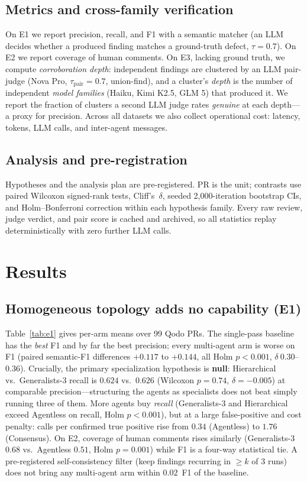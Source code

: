 \documentclass[conference]{IEEEtran}
\begin{document}
\subsection{Metrics and cross-family verification}
On E1 we report precision, recall, and F1 with a semantic matcher (an LLM decides
whether a produced finding matches a ground-truth defect, $\tau{=}0.7$). On E2 we
report coverage of human comments. On E3, lacking ground truth, we compute
\emph{corroboration depth}: independent findings are clustered by an LLM
pair-judge (Nova Pro, $\tau_{\text{pair}}{=}0.7$, union-find), and a cluster's
\emph{depth} is the number of independent \emph{model families} (Haiku, Kimi
K2.5, GLM 5) that produced it. We report the fraction of clusters a second LLM
judge rates \emph{genuine} at each depth---a proxy for precision. Across all
datasets we also collect operational cost: latency, tokens, LLM calls, and
inter-agent messages.

\subsection{Analysis and pre-registration}
Hypotheses and the analysis plan are pre-registered. PR is the unit; contrasts
use paired Wilcoxon signed-rank tests, Cliff's~$\delta$, seeded 2{,}000-iteration
bootstrap CIs, and Holm--Bonferroni correction within each hypothesis family.
Every raw review, judge verdict, and pair score is cached and archived, so all
statistics replay deterministically with zero further LLM calls.

\section{Results}
\subsection{Homogeneous topology adds no capability (E1)}
Table~\ref{tab:e1} gives per-arm means over 99 Qodo PRs. The single-pass baseline
has the \emph{best} F1 and by far the best precision; every multi-agent arm is
worse on F1 (paired semantic-F1 differences $+0.117$ to $+0.144$, all Holm
$p<0.001$, $\delta\ 0.30$--$0.36$). Crucially, the primary specialization
hypothesis is \textbf{null}: Hierarchical vs.\ Generalists-3 recall is
$0.624$ vs.\ $0.626$ (Wilcoxon $p{=}0.74$, $\delta{=}{-}0.005$) at comparable
precision---structuring the agents as specialists does not beat simply running
three of them. More agents buy \emph{recall} (Generalists-3 and Hierarchical
exceed Agentless on recall, Holm $p<0.001$), but at a large false-positive and
cost penalty: calls per confirmed true positive rise from $0.34$ (Agentless) to
$1.76$ (Consensus). On E2, coverage of human comments rises similarly
(Generalists-3 $0.68$ vs.\ Agentless $0.51$, Holm $p{=}0.001$) while F1 is a
four-way statistical tie. A pre-registered self-consistency filter (keep findings
recurring in $\geq k$ of 3 runs) does not bring any multi-agent arm within
$0.02$~F1 of the baseline.
\end{document}
